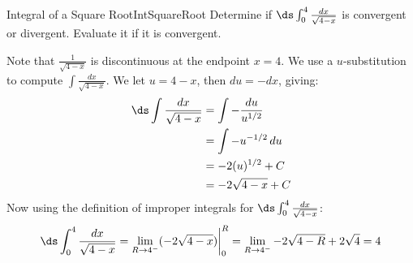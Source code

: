 \begin{example}{Integral of a Square Root}{IntSquareRoot}
Determine if $\ds\int_0^4\frac{dx}{\sqrt{4-x}}$ is convergent or divergent. Evaluate it if it is convergent.
\end{example}
\begin{solution}
Note that $\frac{1}{\sqrt{4-x}}$ is discontinuous at the endpoint $x=4$. We use a $u$-substitution to compute $\int \frac{dx}{\sqrt{4-x}}$. We let $u=4-x$, then $du=-dx$, giving:
\begin{align*}
\ds\int\frac{dx}{\sqrt{4-x}}&=\int-\frac{du}{u^{1/2}}	\\
&=\int -u^{-1/2}\,du	\\
&=-2(u)^{1/2}+C	\\
&=-2\sqrt{4-x}+C
\end{align*}
Now using the definition of improper integrals for $\ds\int_0^4\frac{dx}{\sqrt{4-x}}$:
\[\ds\int_0^4\frac{dx}{\sqrt{4-x}}=\lim_{R\to4^{-}}(-2\sqrt{4-x})\bigg|_0^R=\lim_{R\to4^{-}}-2\sqrt{4-R}+2\sqrt{4}=4\]
\end{solution}

